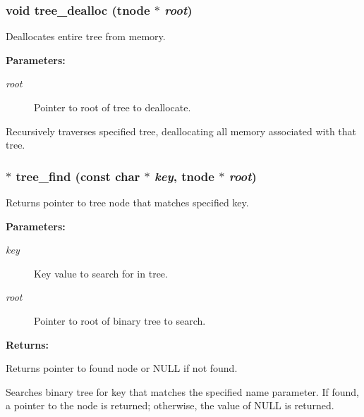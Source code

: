 \subsubsection{\setlength{\rightskip}{0pt plus 5cm}void tree\_\-dealloc ({\bf tnode} $\ast$ {\em root})}\label{tree_8c_a3}


Deallocates entire tree from memory.

\begin{Desc}
\item[{\bf Parameters: }]\par
\begin{description}
\item[
{\em root}]Pointer to root of tree to deallocate.

\end{description}
\end{Desc}
Recursively traverses specified tree, deallocating all memory associated with that tree. 
\subsubsection{ $\ast$ tree\_\-find (const char $\ast$ {\em key}, {\bf tnode} $\ast$ {\em root})}\label{tree_8c_a1}


Returns pointer to tree node that matches specified key.

\begin{Desc}
\item[{\bf Parameters: }]\par
\begin{description}
\item[
{\em key}]Key value to search for in tree. \item[
{\em root}]Pointer to root of binary tree to search.

\end{description}
\end{Desc}
\begin{Desc}
\item[{\bf Returns: }]\par
Returns pointer to found node or NULL if not found.

\end{Desc}
Searches binary tree for key that matches the specified name parameter. If found, a pointer to the node is returned; otherwise, the value of NULL is returned. 
